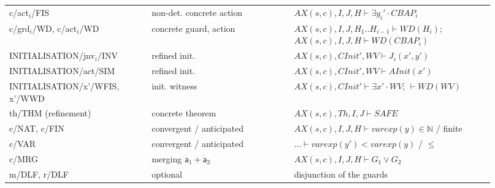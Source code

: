\documentclass[11pt,a4paper]{article}
\newcommand{\nat}{\mathbb{N}}
\newcommand{\WD}{\mathit{WD}}
\newcommand{\AX}{\mathit{AX}(s,c)}
\newcommand{\Th}{\mathit{Th}}
\newcommand{\po}[1]{\textsf{\small #1}}
\begin{document}
\begin{longtable}{p{0.27\linewidth} p{0.27\linewidth} p{0.38\linewidth}}
\po{c/act$_i$/FIS} & non-det. concrete action & $\AX,I,J,H\vdash\exists y_i'\cdot\mathit{CBAP}_i$\\
\po{c/grd$_i$/WD}, \po{c/act$_i$/WD} & concrete guard, action & $\AX,I,J,H_1..H_{i-1}\vdash\WD(H_i)$; $\AX,I,J,H\vdash\WD(\mathit{CBAP}_i)$\\
\po{INITIALISATION/jnv$_i$/INV} & refined init. & $\AX,\mathit{CInit}',\mathit{WV}\vdash J_i(x',y')$\\
\po{INITIALISATION/act/SIM} & refined init. & $\AX,\mathit{CInit}',\mathit{WV}\vdash \mathit{AInit}(x')$\\
\po{INITIALISATION/x'/WFIS}, \po{x'/WWD} & init. witness & $\AX,\mathit{CInit}'\vdash\exists x'\cdot\mathit{WV}$; $\vdash\WD(\mathit{WV})$\\
\po{th/THM} (refinement) & concrete theorem & $\AX,\Th,I,J\vdash\mathit{SAFE}$\\
\po{c/NAT}, \po{c/FIN} & convergent / anticipated & $\AX,I,J,H\vdash \mathit{varexp}(y)\in\nat$ / finite\\
\po{c/VAR} & convergent / anticipated & $\dots\vdash \mathit{varexp}(y')<\mathit{varexp}(y)$ / $\le$\\
\po{c/MRG} & merging $\mathsf{a}_1+\mathsf{a}_2$ & $\AX,I,J,H\vdash G_1\vee G_2$\\
\po{m/DLF}, \po{r/DLF} & optional & disjunction of the guards\\
\bottomrule
\end{longtable}



\end{document}
